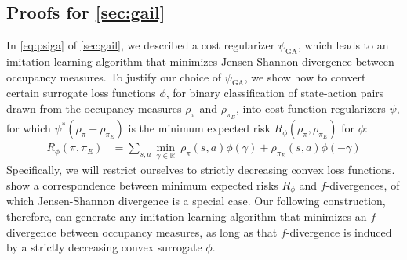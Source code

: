 \documentclass{article}
\newcommand\bbR{\ensuremath{\mathbb{R}}} %
\newcommand\psiga{\ensuremath{\psi_\text{GA}}}
\newcommand{\1}{\mathbb{I}} %
\begin{document}
\subsection{\texorpdfstring{Proofs for \cref{sec:gail}}{{Proofs for Section 5}}} \label{sec:proofs2}

In \cref{eq:psiga} of \cref{sec:gail}, we described a cost regularizer $\psiga$, which leads to an imitation learning algorithm  that minimizes Jensen-Shannon divergence between occupancy measures.
To justify our choice of $\psiga$, we show how to convert certain surrogate loss functions $\phi$,
for binary classification of state-action pairs drawn from the occupancy measures $\rho_\pi$ and $\rho_{\pi_E}$,
into cost function regularizers $\psi$, for which $\psi^*(\rho_\pi - \rho_{\pi_E})$
is the minimum expected risk $R_\phi(\rho_\pi,\rho_{\pi_E})$ for $\phi$:
\begin{align}
R_\phi(\pi,\pi_E) &= \sum_{s,a}\min_{\gamma\in\bbR}\ \rho_\pi(s,a)\phi(\gamma) + \rho_{\pi_E}(s,a)\phi(-\gamma)
\end{align}
Specifically, we will restrict ourselves to strictly decreasing convex loss functions.
\citet{nguyen2009surrogate} show a correspondence between minimum expected risks $R_\phi$ and $f$-divergences,
of which Jensen-Shannon divergence is a special case.
Our following construction, therefore, can generate any imitation learning algorithm that minimizes an $f$-divergence between occupancy measures,
as long as that $f$-divergence is induced by a strictly decreasing convex surrogate $\phi$.
\end{document}

